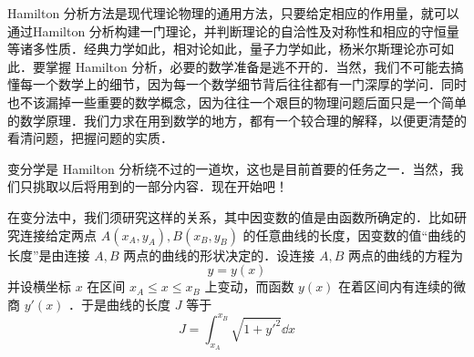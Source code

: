 
Hamilton 分析方法是现代理论物理的通用方法，只要给定相应的作用量，就可以通过Hamilton 分析构建一门理论，并判断理论的自洽性及对称性和相应的守恒量等诸多性质．经典力学如此，相对论如此，量子力学如此，杨米尔斯理论亦可如此．要掌握 Hamilton 分析，必要的数学准备是逃不开的．当然，我们不可能去搞懂每一个数学上的细节，因为每一个数学细节背后往往都有一门深厚的学问．同时也不该漏掉一些重要的数学概念，因为往往一个艰巨的物理问题后面只是一个简单的数学原理．我们力求在用到数学的地方，都有一个较合理的解释，以便更清楚的看清问题，把握问题的实质．

变分学是 Hamilton 分析绕不过的一道坎，这也是目前首要的任务之一．当然，我们只挑取以后将用到的一部分内容．现在开始吧！

在变分法中，我们须研究这样的关系，其中因变数的值是由函数所确定的．比如研究连接给定两点 $A(x_A,y_A),B(x_B,y_B)$ 的任意曲线的长度，因变数的值“曲线的长度”是由连接 $A,B$ 两点的曲线的形状决定的．设连接 $A,B$ 两点的曲线的方程为
\begin{equation}
y=y(x)
\end{equation}
并设横坐标 $x$ 在区间 $x_A\leq x\leq x_B$ 上变动，而函数 $y(x)$ 在着区间内有连续的微商 $y'(x)$ ．于是曲线的长度 $J$ 等于
\begin{equation}
J=\int_{x_A}^{x_B} \sqrt{1+y'^2}\dd x
\end{equation}
